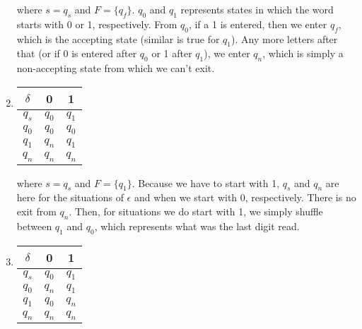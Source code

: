 \documentclass[11pt]{article}
\theoremstyle{definition}
\theoremstyle{case}
\theoremstyle{theorem}
\begin{document}
\begin{enumerate}[label=(\alph*)]
where $s = q_s$ and $F = \{q_f\}$. $q_0$ and $q_1$ represents states in which
the word starts with 0 or 1, respectively. From $q_0$, if a 1 is entered, then we
enter $q_f$, which is the accepting state (similar is true for $q_1$). Any more
letters after that (or if 0 is entered after $q_0$ or 1 after $q_1$), we enter $q_n$, which
is simply a non-accepting state from which we can't exit. 

\vspace{15px}

\item
\begin{tabular}{|c||c|c|}
$\delta$ & 0 & 1 \\

\hline

$q_s$ & $q_0$ & $q_1$ \\

\hline

$q_0$ & $q_0$ & $q_0$ \\

\hline

$q_1$ & $q_n$ & $q_1$ \\

\hline

$q_n$ & $q_n$ & $q_n$
\end{tabular}

where $s = q_s$ and $F = \{q_1\}$. Because we have to start with 1, $q_s$ and $q_n$ 
are here for the situations of $\epsilon$ and when we start with 0, respectively. There is
no exit from $q_n$. Then, for situations we do start with 1, we simply shuffle between $q_1$
and $q_0$, which represents what was the last digit read. 

\vspace{15px}

\item
\begin{tabular}{|c||c|c|}
$\delta$ & 0 & 1 \\

\hline

$q_s$ & $q_0$ & $q_1$ \\

\hline

$q_0$ & $q_n$ & $q_1$ \\

\hline

$q_1$ & $q_0$ & $q_n$ \\

\hline

$q_n$ & $q_n$ & $q_n$
\end{tabular}


\end{enumerate}
\end{document}
